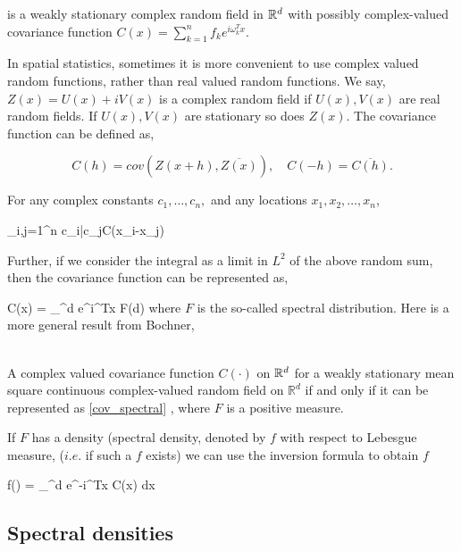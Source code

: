 is a weakly stationary complex random field in $\mathbb{R}^d$ with possibly complex-valued covariance function $C(x) = \sum_{k=1}^n f_k e^{i\omega_k^Tx}$.

In spatial statistics, sometimes it is more convenient to use complex valued random functions, rather than real valued random functions. We say, $Z(x)=U(x) + i V(x)$ is a complex random field if $U(x),V(x)$ are real random fields. If $U(x),V(x)$ are stationary so does $Z(x)$. The covariance function can be defined as,

\[
	C(h) = cov(Z(x+h), \overline{Z(x)}), \quad C(-h)=\overline{C(h)}.
\]

For any complex constants $c_1,\ldots, c_n,$ and any locations $x_1, x_2, \ldots, x_n$,

\beq
\sum_{i,j=1}^n c_i\bar{c_j}C(x_i-x_j)
\eeq

Further, if we consider the integral as a limit in $L^2$ of the above random sum, then the covariance function can be represented as,

\beq \label{cov_spectral}
C(x) = \int_{^d} e^{i\omega^Tx} F(d\omega)
\eeq
where $F$ is the so-called spectral distribution. Here is a more general result from Bochner,

\begin{theorem}\hfill \\
A complex valued covariance function $C(\cdot)$ on $\mathbb{R}^d$ for a weakly stationary mean square continuous complex-valued random field on $\mathbb{R}^d$ if and only if it can be represented as \eqref{cov_spectral} , where $F$ is a positive measure.
\end{theorem}

If $F$ has a density (spectral density, denoted by $f$ with respect to Lebesgue measure, ($i.e.$ if such a $f$ exists) we can use the inversion formula to obtain $f$


\beq
f(\omega) =   \int_{^d} e^{-i\omega^Tx} C(x) dx
\eeq

\subsection{\bf Spectral densities}

